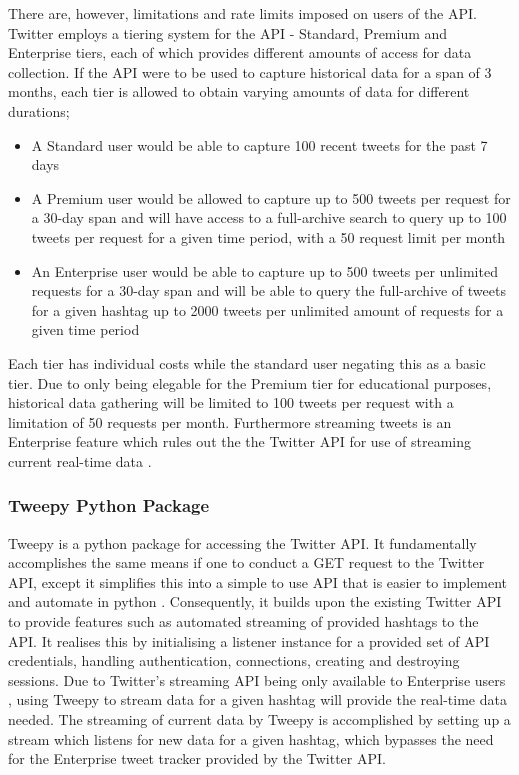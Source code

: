 \documentclass[oneside, 12pt]{article}
\begin{document}
			There are, however, limitations and rate limits imposed on users of the API. Twitter employs a tiering system for the API - Standard, Premium and Enterprise tiers, each of which provides different amounts of access for data collection. If the API were to be used to capture historical data for a span of 3 months, each tier is allowed to obtain varying amounts of data for different durations; \cite{7}
			
			\begin{itemize}
				\item A Standard user would be able to capture 100 recent tweets for the past 7 days
				\item A Premium user would be allowed to capture up to 500 tweets per request for a 30-day span and will have access to a full-archive search to query up to 100 tweets per request for a given time period, with a 50 request limit per month
				\item An Enterprise user would be able to capture up to 500 tweets per unlimited requests for a 30-day span and will be able to query the full-archive of tweets for a given hashtag up to 2000 tweets per unlimited amount of requests for a given time period
			\end{itemize}
		
			Each tier has individual costs while the standard user negating this as a basic tier. Due to only being elegable for the Premium tier for educational purposes, historical data gathering will be limited to 100 tweets per request with a limitation of 50 requests per month. Furthermore streaming tweets is an Enterprise feature which rules out the the Twitter API for use of streaming current real-time data \cite{8}.
		
			\subsubsection{Tweepy Python Package}
			Tweepy is a python package for accessing the Twitter API. It fundamentally accomplishes the same means if one to conduct a GET request to the Twitter API, except it simplifies this into a simple to use API that is easier to implement and automate in python \cite{9}. Consequently, it builds upon the existing Twitter API to provide features such as automated streaming of provided hashtags to the API. It realises this by initialising a listener instance for a provided set of API credentials, handling authentication, connections, creating and destroying sessions. Due to Twitter's streaming API being only available to Enterprise users \cite{7}, using Tweepy to stream data for a given hashtag will provide the real-time data needed. The streaming of current data by Tweepy is accomplished by setting up a stream which listens for new data for a given hashtag, which bypasses the need for the Enterprise tweet tracker provided by the Twitter API.
			
\end{document}

